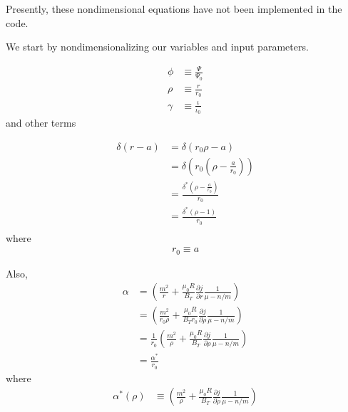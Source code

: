 \documentclass{article}
\begin{document}
Presently, these nondimensional equations have not been implemented in the code.

We start by nondimensionalizing our variables and input parameters.  

\begin{equation} \label{wessonCurrentProfile}
\begin{split}
\phi&\equiv\frac{\Psi}{\Psi_0} \\
\rho&\equiv\frac{r}{r_0} \\
\gamma&\equiv\frac{\iota}{\iota_0}
\end{split} 
\end{equation} 
and other terms

\begin{equation} \label{wessonCurrentProfile}
\begin{split}
\delta(r-a) & = \delta(r_0 \rho - a) \\
& = \delta\left(r_0(\rho-\frac{a}{r_0})\right)\\
& = \frac{\delta^*\left(\rho-\frac{a}{r_0}\right)}{r_0}\\
& = \frac{\delta^*\left(\rho-1\right)}{r_0}\\
\end{split} 
\end{equation} 
where 
\begin{equation} \label{wessonCurrentProfile}
\begin{split}
r_0 \equiv a
\end{split} 
\end{equation} 

Also,
\begin{equation} \label{wessonCurrentProfile}
\begin{split}
\alpha&=\left( \frac{m^2}{r} +\frac{\mu_0 R}{B_T} \frac{\partial j}{\partial r}\frac{1}{\mu-n/m} \right) \\
&=\left( \frac{m^2}{r_0 \rho} +\frac{\mu_0 R}{B_T r_0} \frac{\partial j}{\partial \rho}\frac{1}{\mu-n/m} \right) \\
&=\frac{1}{r_0}\left( \frac{m^2}{ \rho} +\frac{\mu_0 R}{B_T} \frac{\partial j}{\partial \rho}\frac{1}{\mu-n/m} \right) \\
&=\frac{\alpha^*}{r_0}
\end{split} 
\end{equation} 
where
\begin{equation} \label{wessonCurrentProfile}
\begin{split}
\alpha^*(\rho)& \equiv \left( \frac{m^2}{ \rho} +\frac{\mu_0 R}{B_T} \frac{\partial j}{\partial \rho}\frac{1}{\mu-n/m} \right) \\
\end{split} 
\end{equation} 
\end{document}
